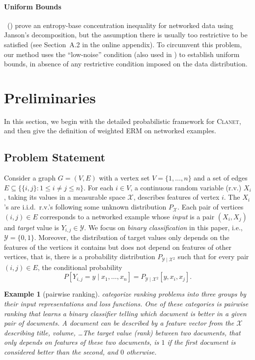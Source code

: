 \documentclass[letterpaper]{article} %
\newtheorem{example}{Example}
\newcommand{\xspace}{\mathcal{X}}
\newcommand{\yspace}{\mathcal{Y}}
\newcommand{\edge}[1]{\{#1\}}
\newcommand{\pair}[1]{(#1)}
\newcommand{\problemabbr}{\textnormal{C}\textsc{lanet}}
\newcommand{\red}[1]{\textcolor{red}{#1}}
\newcommand{\todo}[1]{\red{\textsc{todo:} #1}}
\newcommand{\citet}[1]{\citeauthor{#1}\ (\citeyear{#1})}
\begin{document}
\paragraph{Uniform Bounds} 
\citet{DBLP:conf/icml/RalaivolaA15} prove an entropy-base concentration inequality for networked data using Janson's decomposition, but the 
assumption there is usually too restrictive to be satisfied %
(see Section~A.2 in the online appendix). 
To circumvent this problem, our method uses 
the ``low-noise'' condition (also used in \cite{papa2016graph}) to establish uniform bounds, 
in absence of any restrictive condition imposed on the data distribution. 

\section{Preliminaries} %
\label{sec:preliminaries}

In this section, we begin with the detailed probabilistic framework for \problemabbr{}, and then give the definition of weighted ERM on networked examples. 

\subsection{Problem Statement} %
\label{sub:problem_statement}

Consider a graph $G=(V,E)$ with a vertex set $V=\{1,\dots,n\}$ and a set of edges $E\subseteq\{\edge{i,j}: 1\le i\neq j\le n\}$. 
For each $i\in V$, a continuous random variable (r.v.) $X_i$, taking its values in a measurable space $\xspace{}$, describes features of vertex $i$. The $X_i$'s are i.i.d.\ r.v.'s following some unknown distribution $P_\xspace$.
Each pair of vertices $\pair{i,j}\in E$ corresponds to a networked example whose \emph{input} is a pair $(X_i,X_j)$ and \emph{target} value is $Y_{i,j}\in\yspace{}.$ 
We focus on \emph{binary classification} in this paper, i.e., $\yspace{} = \{0,1\}$. 
Moreover, the distribution of target values only depends on the features of the vertices it contains but does not depend on features of other vertices, that is, there is a probability distribution $P_{\yspace{}\mid\xspace{}^2}$ such that for every pair $\pair{i,j}\in E$, the conditional probability 
\[P\left[Y_{i,j}=y\mid x_1,\ldots,x_n\right]=P_{\yspace{}\mid\xspace{}^2}\left[y,x_i,x_j\right].\]  

\begin{example}[pairwise ranking]
\cite{liu2009learning} categorize ranking problems into three groups by their input representations and loss functions. One of these categories is \emph{pairwise ranking} that learns a binary classifier telling which document is better in a given pair of documents. A document can be described by a feature vector from the $\xspace$ describing title, volume, \ldots The target value (rank) between two documents, that only depends on features of these two documents, is $1$ if the first document is considered better than the second, and $0$ otherwise. 
\end{example}
\end{document}
